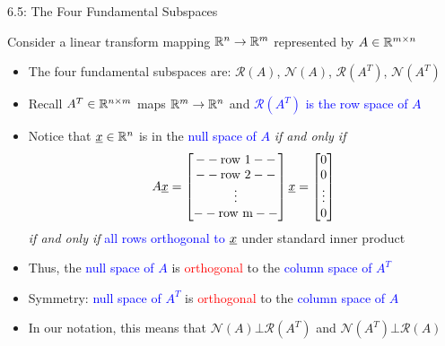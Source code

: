 \documentclass[10pt,letterpaper,english]{beamer}
\begin{document}
\begin{frame}{6.5: The Four Fundamental Subspaces}

Consider a linear transform mapping $\mathbb{R}^n \to \mathbb{R}^m$ represented by $A\in \mathbb{R}^{m\times n}$

\begin{itemize}
\setlength\itemsep{1mm}

\item<1-> The four fundamental subspaces are: $\mathcal{R}(A)$, $\mathcal{N}(A)$, $\mathcal{R}(A^T)$, $\mathcal{N}(A^T)$

\item<1-> Recall $A^T \in \mathbb{R}^{n\times m}$ maps $\mathbb{R}^m \to \mathbb{R}^n$ and \textcolor{blue}{$\mathcal{R}(A^T)$ is the row space of $A$}

\vspace{3mm}

\item<2-> Notice that $\underline{x} \in \mathbb{R}^n$ is in the \textcolor{blue}{null space of $A$} \emph{if and only if} \vspace{-1mm}
\[ A \underline{x} = \begin{bmatrix} -- \text{row 1} -- \\ -- \text{row 2} -- \\ \vdots \\ -- \text{row m} -- \end{bmatrix} \underline{x} = \begin{bmatrix} 0 \\ 0 \\ \vdots \\ 0 \end{bmatrix} \]
\emph{if and only if} \textcolor{blue}{all rows orthogonal to $\underline{x}$} under standard inner product

\vspace{3mm}

\item<3-> Thus, the \textcolor{blue}{null space of $A$} is \textcolor{red}{orthogonal} to the \textcolor{blue}{column space of $A^T$} 

\item<4-> Symmetry: \textcolor{blue}{null space of $A^T$} is \textcolor{red}{orthogonal} to the \textcolor{blue}{column space of $A$} 

\vspace{2mm}

\item<5-> In our notation, this means that $\mathcal{N}(A) \bot \mathcal{R}(A^T)$ and $\mathcal{N}(A^T) \bot \mathcal{R}(A)$

\end{itemize}
\end{frame}
\end{document}
